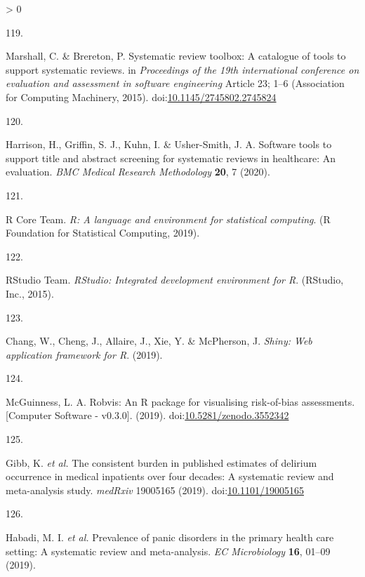 \documentclass[a4paper, twoside]{templates/ociamthesis}
\newlength{\cslhangindent}
\newlength{\csllabelwidth}
\newenvironment{CSLReferences}[3] %
 {%
  \setlength{\parindent}{0pt}
  \ifodd #1 \everypar{\setlength{\hangindent}{\cslhangindent}}\ignorespaces\fi
  \ifnum #2 > 0
  \setlength{\parskip}{#2\baselineskip}
  \fi
 }%
 {}
\newcommand{\CSLLeftMargin}[1]{\parbox[t]{\maxof{\widthof{#1}}{\csllabelwidth}}{#1}}
\newcommand{\CSLRightInline}[1]{\parbox[t]{\linewidth - \csllabelwidth}{#1}}
\begin{document}
\begin{CSLReferences}{0}{0}
\leavevmode\hypertarget{ref-marshall2015systematic}{}%
\CSLLeftMargin{119. }
\CSLRightInline{Marshall, C. \& Brereton, P. Systematic review toolbox: A catalogue of tools to support systematic reviews. in \emph{Proceedings of the 19th international conference on evaluation and assessment in software engineering} Article 23; 1--6 ({Association for Computing Machinery}, 2015). doi:\href{https://doi.org/10.1145/2745802.2745824}{10.1145/2745802.2745824}}

\leavevmode\hypertarget{ref-harrison2020software}{}%
\CSLLeftMargin{120. }
\CSLRightInline{Harrison, H., Griffin, S. J., Kuhn, I. \& Usher-Smith, J. A. Software tools to support title and abstract screening for systematic reviews in healthcare: An evaluation. \emph{BMC Medical Research Methodology} \textbf{20}, 7 (2020).}

\leavevmode\hypertarget{ref-rref}{}%
\CSLLeftMargin{121. }
\CSLRightInline{R Core Team. \emph{R: {A} language and environment for statistical computing}. ({R Foundation for Statistical Computing}, 2019).}

\leavevmode\hypertarget{ref-rstudioref}{}%
\CSLLeftMargin{122. }
\CSLRightInline{RStudio Team. \emph{{RStudio}: {Integrated} development environment for {R}}. ({RStudio, Inc.}, 2015).}

\leavevmode\hypertarget{ref-shinyref}{}%
\CSLLeftMargin{123. }
\CSLRightInline{Chang, W., Cheng, J., Allaire, J., Xie, Y. \& McPherson, J. \emph{Shiny: {Web} application framework for {R}}. (2019).}

\leavevmode\hypertarget{ref-mcguinness2019a}{}%
\CSLLeftMargin{124. }
\CSLRightInline{McGuinness, L. A. Robvis: {An R} package for visualising risk-of-bias assessments. {[}{Computer Software} - v0.3.0{]}. (2019). doi:\href{https://doi.org/10.5281/zenodo.3552342}{10.5281/zenodo.3552342}}

\leavevmode\hypertarget{ref-gibb2019consistent}{}%
\CSLLeftMargin{125. }
\CSLRightInline{Gibb, K. \emph{et al.} The consistent burden in published estimates of delirium occurrence in medical inpatients over four decades: A systematic review and meta-analysis study. \emph{medRxiv} 19005165 (2019). doi:\href{https://doi.org/10.1101/19005165}{10.1101/19005165}}

\leavevmode\hypertarget{ref-habadi2019prevalence}{}%
\CSLLeftMargin{126. }
\CSLRightInline{Habadi, M. I. \emph{et al.} Prevalence of panic disorders in the primary health care setting: {A} systematic review and meta-analysis. \emph{EC Microbiology} \textbf{16}, 01--09 (2019).}


\end{CSLReferences}
\end{document}
